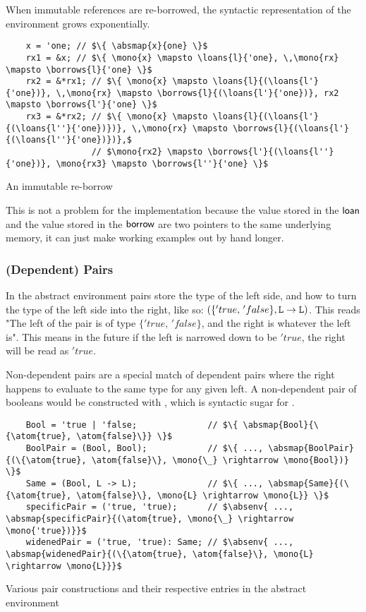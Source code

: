 \documentclass[12pt,twoside]{report}
\begin{document}
When immutable references are re-borrowed, the syntactic representation of the environment grows exponentially.

\begin{listing}[H]
  \begin{verbatim}
    x = 'one; // $\{ \absmap{x}{one} \}$
    rx1 = &x; // $\{ \mono{x} \mapsto \loans{l}{'one}, \,\mono{rx} \mapsto \borrows{l}{'one} \}$
    rx2 = &*rx1; // $\{ \mono{x} \mapsto \loans{l}{(\loans{l'}{'one})}, \,\mono{rx} \mapsto \borrows{l}{(\loans{l'}{'one})}, rx2 \mapsto \borrows{l'}{'one} \}$
    rx3 = &*rx2; // $\{ \mono{x} \mapsto \loans{l}{(\loans{l'}{(\loans{l''}{'one})})}, \,\mono{rx} \mapsto \borrows{l}{(\loans{l'}{(\loans{l''}{'one})})},$
                 // $\mono{rx2} \mapsto \borrows{l'}{(\loans{l''}{'one})}, \mono{rx3} \mapsto \borrows{l''}{'one} \}$
  \end{verbatim}
  \caption{An immutable re-borrow}
\end{listing}

This is not a problem for the implementation because the value stored in the $\mathsf{loan}$ and the value stored in the $\mathsf{borrow}$ are two pointers to the same underlying memory, it can just make working examples out by hand longer.

\subsubsection{(Dependent) Pairs}
In the abstract environment pairs store the type of the left side, and how to turn the type of the left side into the right, like so: $(\{'true, \, 'false\}, \text{\texttt{L}} \rightarrow \text{\texttt{L}})$. This reads "The left of the pair is of type $\{'true, \, 'false\}$, and the right is whatever the left is". This means in the future if the left is narrowed down to be $'true$, the right will be read as $'true$.

Non-dependent pairs are a special match of dependent pairs where the right happens to evaluate to the same type for any given left. A non-dependent pair of booleans would be constructed with , which is syntactic sugar for .

\begin{listing}[H]
  \begin{verbatim}
    Bool = 'true | 'false;              // $\{ \absmap{Bool}{\{\atom{true}, \atom{false}\}} \}$
    BoolPair = (Bool, Bool);            // $\{ ..., \absmap{BoolPair}{(\{\atom{true}, \atom{false}\}, \mono{\_} \rightarrow \mono{Bool})} \}$
    Same = (Bool, L -> L);              // $\{ ..., \absmap{Same}{(\{\atom{true}, \atom{false}\}, \mono{L} \rightarrow \mono{L}} \}$
    specificPair = ('true, 'true);      // $\absenv{ ..., \absmap{specificPair}{(\atom{true}, \mono{\_} \rightarrow \mono{'true})}}$
    widenedPair = ('true, 'true): Same; // $\absenv{ ..., \absmap{widenedPair}{(\{\atom{true}, \atom{false}\}, \mono{L} \rightarrow \mono{L}}}$
  \end{verbatim}
  \caption{Various pair constructions and their respective entries in the abstract environment}
\end{listing}
\end{document}
